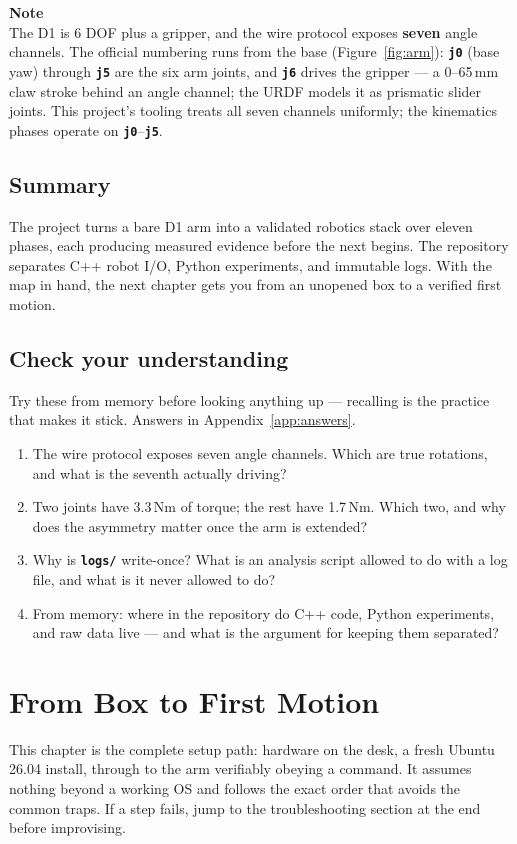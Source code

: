 \documentclass[11pt,twoside,openright]{book}
\newcommand{\code}[1]{\texttt{\bfseries #1}}
\newenvironment{pktnote}{\begin{pktbox}\textbf{Note}\\[4pt]}{\end{pktbox}}
\newenvironment{pktcheck}{%
  \section*{Check your understanding}%
  \addcontentsline{toc}{section}{Check your understanding}%
  \noindent Try these from memory before looking anything up --- recalling
  is the practice that makes it stick. Answers in Appendix~\ref{app:answers}.%
  \begin{enumerate}}{\end{enumerate}}
\begin{document}
\begin{pktnote}
The D1 is 6 DOF plus a gripper, and the wire protocol exposes
\textbf{seven} angle channels. The official numbering runs from the base
(Figure~\ref{fig:arm}): \code{j0} (base yaw) through \code{j5} are the six
arm joints, and \code{j6} drives the gripper --- a 0--65\,mm claw stroke
behind an angle channel; the URDF models it as prismatic slider joints.
This project's tooling treats all seven channels uniformly; the
kinematics phases operate on \code{j0}--\code{j5}.
\end{pktnote}

\section*{Summary}

The project turns a bare D1 arm into a validated robotics stack over eleven
phases, each producing measured evidence before the next begins. The
repository separates C++ robot I/O, Python experiments, and immutable logs.
With the map in hand, the next chapter gets you from an unopened box to a
verified first motion.

\begin{pktcheck}
  \item The wire protocol exposes seven angle channels. Which are true
    rotations, and what is the seventh actually driving?
  \item Two joints have 3.3\,Nm of torque; the rest have 1.7\,Nm. Which
    two, and why does the asymmetry matter once the arm is extended?
  \item Why is \code{logs/} write-once? What is an analysis script
    allowed to do with a log file, and what is it never allowed to do?
  \item From memory: where in the repository do C++ code, Python
    experiments, and raw data live --- and what is the argument for
    keeping them separated?
\end{pktcheck}


\chapter{From Box to First Motion}\label{ch:setup}

This chapter is the complete setup path: hardware on the desk, a fresh
Ubuntu 26.04 install, through to the arm verifiably obeying a command. It
assumes nothing beyond a working OS and follows the exact order that
avoids the common traps. If a step fails, jump to the troubleshooting
section at the end before improvising.
\end{document}
